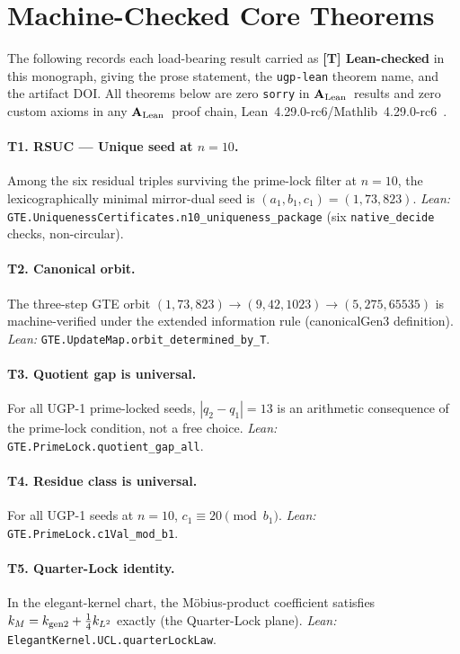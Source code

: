 \documentclass[12pt]{article}
\numberwithin{equation}{section}
\newcommand{\CatAL}{\ensuremath{\textbf{A}_{\rm Lean}}}
\begin{document}
\section{Machine-Checked Core Theorems}\label{app:lean-theorems}

The following records each load-bearing result carried as \textbf{[T] Lean-checked} in this monograph, giving the prose statement, the \texttt{ugp-lean} theorem name, and the artifact DOI. All theorems below are zero \texttt{sorry} in \CatAL\ results and zero custom axioms in any \CatAL\ proof chain, Lean~4.29.0-rc6/Mathlib~4.29.0-rc6~\cite{SpivackUGPFormalization,ugp-lean}.

\paragraph{T1. RSUC — Unique seed at $n=10$.}
Among the six residual triples surviving the prime-lock filter at $n=10$, the lexicographically minimal mirror-dual seed is $(a_1,b_1,c_1)=(1,73,823)$.
\textit{Lean:} \texttt{GTE.UniquenessCertificates.n10\_uniqueness\_package} (six \texttt{native\_decide} checks, non-circular).

\paragraph{T2. Canonical orbit.}
The three-step GTE orbit $(1,73,823)\to(9,42,1023)\to(5,275,65535)$ is machine-verified under the extended information rule (canonicalGen3 definition).
\textit{Lean:} \texttt{GTE.UpdateMap.orbit\_determined\_by\_T}.

\paragraph{T3. Quotient gap is universal.}
For all UGP-1 prime-locked seeds, $|q_2-q_1|=13$ is an arithmetic consequence of the prime-lock condition, not a free choice.
\textit{Lean:} \texttt{GTE.PrimeLock.quotient\_gap\_all}.

\paragraph{T4. Residue class is universal.}
For all UGP-1 seeds at $n=10$, $c_1 \equiv 20 \pmod{b_1}$.
\textit{Lean:} \texttt{GTE.PrimeLock.c1Val\_mod\_b1}.

\paragraph{T5. Quarter-Lock identity.}
In the elegant-kernel chart, the Möbius-product coefficient satisfies $k_M = k_{\rm gen2} + \tfrac{1}{4}k_{L^2}$ exactly (the Quarter-Lock plane).
\textit{Lean:} \texttt{ElegantKernel.UCL.quarterLockLaw}.
\end{document}
